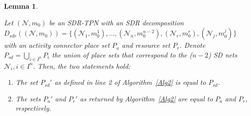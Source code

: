 \documentclass[11pt]{article}
\newtheorem{mylemm}{Lemma}
\begin{document}
\begin{mylemm} \label{lem1}
	\begin{sloppypar}
		Let $(\mathcal{N}, m_0)$ be an SDR-TPN with an SDR
		decomposition $D_{sdr}((\mathcal{N}, m_0)) = \{(\mathcal{N}_1, m_0^1), \ldots, (\mathcal{N}_n, m_0^{n-2}) , (\mathcal{N}_r, m_0^{r}), (\mathcal{N}_j, m_0^{j})\}$ with an activity connector place set $P_a$ and resource set $P_r$. 
		Denote $P_{sd} = \bigcup_{i\in I^n} P_i$ the union of place sets that correspond to the ($n-2$) SD nets $\mathcal{N}_i, i \in I^n$. Then, the two statements hold: \begin{enumerate}
			\item The set $P_{sd}'$ as defined in line 2 of Algorithm~\ref{Alg2} is equal to $P_{sd}$. 
			\item The sets $P_a'$ and $P_r'$ as returned by Algorithm~\ref{Alg2} are equal to $P_a$ and $P_r$, respectively.  
		\end{enumerate}
	\end{sloppypar}
\end{mylemm}
\end{document}

